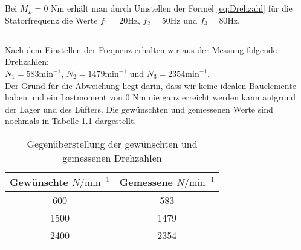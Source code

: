 \chapter{}\label{ex:aufg5}
%
\section{}\label{sec:aufg5a}
%
Bei $M_L = 0$ Nm erhält man durch Umstellen der Formel \ref{eq:Drehzahl} für die Statorfrequenz die Werte $f_1 = 20 \text{Hz}$, $f_2 = 50 \text{Hz}$ und $f_3 = 80 \text{Hz}$.
\section{}\label{sec:aufg5b}
%
Nach dem Einstellen der Frequenz erhalten wir aus der Messung folgende Drehzahlen:\\
$N_1 = 583 \text{min}^{-1}$, $N_2 = 1479 \text{min}^{-1}$ und $N_3 = 2354 \text{min}^{-1}$.\\
Der Grund für die Abweichung liegt darin, dass wir keine idealen Bauelemente haben und ein Lastmoment von 0 Nm nie ganz erreicht werden kann aufgrund der Lager und des Lüfters. Die gewünschten und gemessenen Werte sind nochmals in Tabelle \ref{tab:drehzahlen} dargestellt.
\begin{table}[htb]
	\centering
	\begin{tabular}{c | c}
		Gewünschte $N/\text{min}^{-1}$ & Gemessene $N/\text{min}^{-1}$\\\hline
		600 &  583 \\ 
		1500 & 1479 \\ 
		2400 & 2354
	\end{tabular} 
	\caption{Gegenüberstellung der gewünschten und gemessenen Drehzahlen}
	\label{tab:drehzahlen}
\end{table}
	
	
